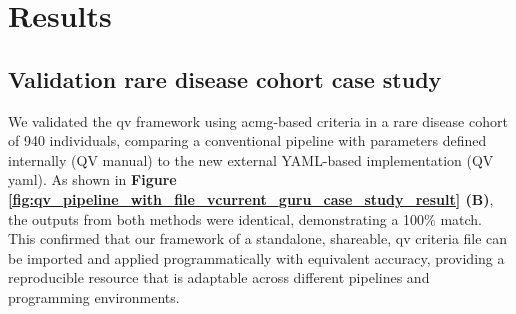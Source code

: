 \section{Results}
\subsection{Validation rare disease cohort case study}
We validated the \ac{qv} framework using \ac{acmg}-based criteria in a rare disease cohort of 940 individuals, comparing a conventional pipeline with parameters defined internally (QV manual) to the new external YAML-based implementation (QV yaml).
As shown in \textbf{Figure \ref{fig:qv_pipeline_with_file_vcurrent_guru_case_study_result} (B)}, 
the outputs from both methods were identical, demonstrating a 100\% match. This confirmed that our framework of a standalone, shareable, \ac{qv} criteria file can be imported and applied programmatically with equivalent accuracy, providing a reproducible resource that is adaptable across different pipelines and programming environments.

